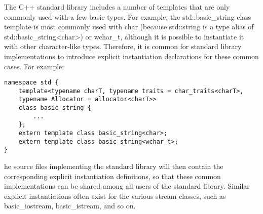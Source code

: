 The C++ standard library includes a number of templates that are only commonly used with a few basic types. For example, the std::basic\_string class template is most commonly used with char (because std::string is a type alias of std::basic\_string<char>) or wchar\_t, although it is possible to instantiate it with other character-like types. Therefore, it is common for standard library implementations to introduce explicit instantiation declarations for these common cases. For example:


\begin{lstlisting}[style=styleCXX]
namespace std {
	template<typename charT, typename traits = char_traits<charT>,
	typename Allocator = allocator<charT>>
	class basic_string {
		...
	};
	extern template class basic_string<char>;
	extern template class basic_string<wchar_t>;
}
\end{lstlisting}

he source files implementing the standard library will then contain the corresponding explicit instantiation definitions, so that these common implementations can be shared among all users of the standard library. Similar explicit instantiations often exist for the various stream classes, such as basic\_iostream, basic\_istream, and so on.